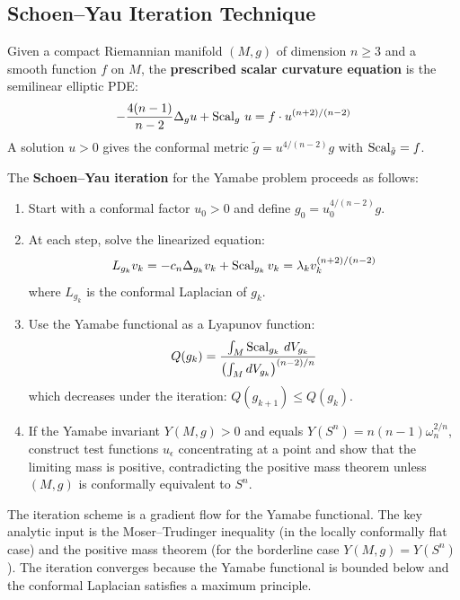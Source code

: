 \subsection{Schoen--Yau Iteration Technique}

\begin{definition}
Given a compact Riemannian manifold $(M, g)$ of dimension $n \geq 3$ and a smooth function $f$ on $M$, the \textbf{prescribed scalar curvature equation} is the semilinear elliptic PDE:
\[
-\frac{4(n-1)}{n-2} \Delta_g u + \operatorname{Scal}_g \, u = f \cdot u^{(n+2)/(n-2)}
\]
A solution $u > 0$ gives the conformal metric $\tilde{g} = u^{4/(n-2)} g$ with $\operatorname{Scal}_{\tilde{g}} = f$.
\end{definition}

\begin{theorem}
The \textbf{Schoen--Yau iteration} for the Yamabe problem proceeds as follows:
\begin{enumerate}
    \item Start with a conformal factor $u_0 > 0$ and define $g_0 = u_0^{4/(n-2)} g$.
    \item At each step, solve the linearized equation:
    \[
    L_{g_k} v_k = -c_n \Delta_{g_k} v_k + \operatorname{Scal}_{g_k} v_k = \lambda_k v_k^{(n+2)/(n-2)}
    \]
    where $L_{g_k}$ is the conformal Laplacian of $g_k$.
    \item Use the Yamabe functional as a Lyapunov function:
    \[
    Q(g_k) = \frac{\int_M \operatorname{Scal}_{g_k} \, dV_{g_k}}{\left(\int_M dV_{g_k}\right)^{(n-2)/n}}
    \]
    which decreases under the iteration: $Q(g_{k+1}) \leq Q(g_k)$.
    \item If the Yamabe invariant $Y(M, g) > 0$ and equals $Y(S^n) = n(n-1)\omega_n^{2/n}$, construct test functions $u_\epsilon$ concentrating at a point and show that the limiting mass is positive, contradicting the positive mass theorem unless $(M, g)$ is conformally equivalent to $S^n$.
\end{enumerate}
\end{theorem}

\begin{remark}
The iteration scheme is a gradient flow for the Yamabe functional. The key analytic input is the Moser--Trudinger inequality (in the locally conformally flat case) and the positive mass theorem (for the borderline case $Y(M, g) = Y(S^n)$). The iteration converges because the Yamabe functional is bounded below and the conformal Laplacian satisfies a maximum principle.
\end{remark}

